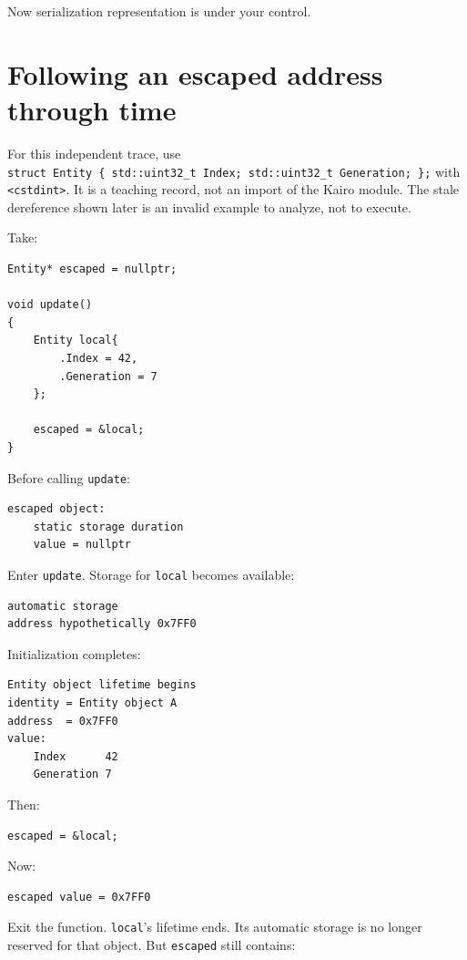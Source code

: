 Now serialization representation is under your control.

\section{Following an escaped address through time}\label{05-engine-i-ch003-following-an-escaped-address-through-time}

For this independent trace, use \texttt{struct\ Entity\ \{\ std::uint32\_t\ Index;\ std::uint32\_t\ Generation;\ \};} with \texttt{\textless{}cstdint\textgreater{}}. It is a teaching record, not an import of the Kairo module. The stale dereference shown later is an invalid example to analyze, not to execute.

Take:

\begin{verbatim}
Entity* escaped = nullptr;

void update()
{
    Entity local{
        .Index = 42,
        .Generation = 7
    };

    escaped = &local;
}
\end{verbatim}

Before calling \texttt{update}:

\begin{verbatim}
escaped object:
    static storage duration
    value = nullptr
\end{verbatim}

Enter \texttt{update}. Storage for \texttt{local} becomes available:

\begin{verbatim}
automatic storage
address hypothetically 0x7FF0
\end{verbatim}

Initialization completes:

\begin{verbatim}
Entity object lifetime begins
identity = Entity object A
address  = 0x7FF0
value:
    Index      42
    Generation 7
\end{verbatim}

Then:

\begin{verbatim}
escaped = &local;
\end{verbatim}

Now:

\begin{verbatim}
escaped value = 0x7FF0
\end{verbatim}

Exit the function. \texttt{local}'s lifetime ends. Its automatic storage is no longer reserved for that object. But \texttt{escaped} still contains:

